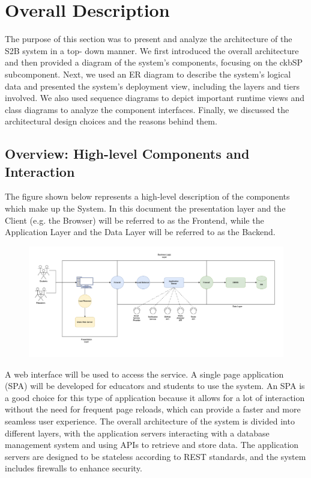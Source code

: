 \documentclass{Configuration_Files/Template}
\begin{document}
\chapter{Overall Description}

The purpose of this section was to present and analyze the architecture of the S2B system in a top- down manner. We first introduced the overall architecture and then provided a diagram of the system’s components, focusing on the ckbSP subcomponent. Next, we used an ER diagram to describe the system’s logical data and presented the system’s deployment view, including the layers and tiers involved. We also used sequence diagrams to depict important runtime views and class diagrams to analyze the component interfaces. Finally, we discussed the architectural design choices and the reasons behind them.

\section{Overview: High-level Components and Interaction}

The figure shown below represents a high-level description of the components which make up the System. In this document the presentation layer and the Client (e.g. the Browser) will be referred to as the Frontend, while the Application Layer and the Data Layer will be referred to as the Backend.

\begin{figure}[H]
\centering
\includegraphics[scale = 0.5]{Images/diagrams/overview.png}\\
\end{figure}

A web interface will be used to access the service. A single page application (SPA) will be developed for educators and students to use the system. An SPA is a good choice for this type of application because it allows for a lot of interaction without the need for frequent page reloads, which can provide a faster and more seamless user experience. The overall architecture of the system is divided into different layers, with the application servers interacting with a database management system and using APIs to retrieve and store data. The application servers are designed to be stateless according to REST standards, and the system includes firewalls to enhance security.
\end{document}
